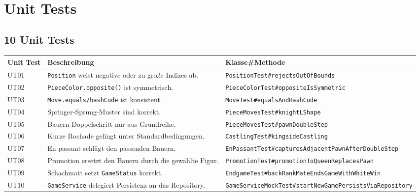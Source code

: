 \documentclass[a4paper,12pt]{article}
\let\oldsection\section
\renewcommand{\section}{\clearpage\oldsection}
\begin{document}
\section{Unit Tests}

\subsection*{10 Unit Tests}

\bigskip
\begin{tabularx}{\textwidth}{|l|X|X|}
    \hline
    \textbf{Unit Test} & \textbf{Beschreibung} & \textbf{Klasse\#Methode} \\
    \hline
    UT01 & \texttt{Position} weist negative oder zu große Indizes ab. & \texttt{PositionTest\#}\allowbreak\texttt{rejectsOutOfBounds} \\[1.2em]
    \hline
    UT02 & \texttt{PieceColor.opposite()} ist symmetrisch. & \texttt{PieceColorTest\#}\allowbreak\texttt{oppositeIsSymmetric} \\[1.2em]
    \hline
    UT03 & \texttt{Move.equals/hashCode} ist konsistent. & \texttt{MoveTest\#}\allowbreak\texttt{equalsAndHashCode} \\[1.2em]
    \hline
    UT04 & Springer-Sprung-Muster sind korrekt. & \texttt{PieceMovesTest\#}\allowbreak\texttt{knightLShape} \\[1.2em]
    \hline
    UT05 & Bauern-Doppelschritt nur aus Grundreihe. & \texttt{PieceMovesTest\#}\allowbreak\texttt{pawnDoubleStep} \\[1.2em]
    \hline
    UT06 & Kurze Rochade gelingt unter Standardbedingungen. & \texttt{CastlingTest\#}\allowbreak\texttt{kingsideCastling} \\[1.2em]
    \hline
    UT07 & En passant schlägt den passenden Bauern. & \texttt{EnPassantTest\#}\allowbreak\texttt{capturesAdjacentPawn}\allowbreak\texttt{AfterDoubleStep} \\[1.2em]
    \hline
    UT08 & Promotion ersetzt den Bauern durch die gewählte Figur. & \texttt{PromotionTest\#}\allowbreak\texttt{promotionToQueen}\allowbreak\texttt{ReplacesPawn} \\[1.2em]
    \hline
    UT09 & Schachmatt setzt \texttt{GameStatus} korrekt. & \texttt{EndgameTest\#}\allowbreak\texttt{backRankMate}\allowbreak\texttt{EndsGameWithWhiteWin} \\[1.2em]
    \hline
    UT10 & \texttt{GameService} delegiert Persistenz an das Repository. & \texttt{GameServiceMockTest\#}\allowbreak\texttt{startNewGame}\allowbreak\texttt{PersistsViaRepository} \\[1.2em]
    \hline
\end{tabularx}
\end{document}

